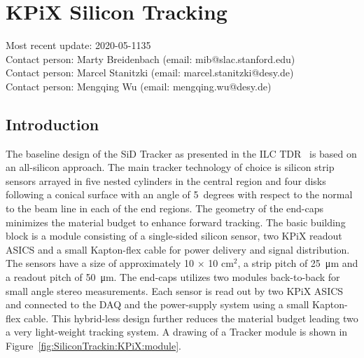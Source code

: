 \newcommand{\LYCORIS}{{\textsc{Lycoris}}\xspace}
\newcommand{\DESYII}{{\mbox{DESY II}}\xspace}
\newcommand{\DIITBF}{{\DESYII Test Beam Facility}\xspace}
\newcommand{\SID}{{SiD}\xspace}
\newcommand{\KPIX}{{KPiX}\xspace}


\section{\KPIX Silicon Tracking}
Most recent update: 2020-05-1135 \\
Contact person: Marty Breidenbach (email: mib@slac.stanford.edu)\\
Contact person: Marcel Stanitzki (email: marcel.stanitzki@desy.de)\\
Contact person: Mengqing Wu (email: mengqing.wu@desy.de)\\




\subsection{Introduction}
The baseline design of the \SID Tracker as presented in the ILC TDR~\cite{Behnke:2013lya} is based on an all-silicon approach.
The main tracker technology of choice is silicon strip sensors arrayed in five nested cylinders in the central
region and four disks following a conical surface with an angle of 5~degrees with respect to the normal to the 
beam line in each of the end regions. The geometry of the end-caps minimizes the material budget to enhance 
forward tracking. The basic building block is a module consisting of a single-sided silicon sensor, two \KPIX readout ASICS and a small Kapton-flex cable
for power delivery and signal distribution.
The sensors have a size of approximately 10 $\times$ 10 cm$^2$, a strip pitch of \SI{25}{\micro\meter} and a readout pitch of \SI{50}{\micro\meter}.
The end-caps utilizes two modules back-to-back for small angle stereo measurements. 
Each sensor is read out by two \KPIX ASICS and connected to the DAQ and the power-supply system using a small Kapton-flex cable. This hybrid-less design 
further reduces the material budget leading two a very light-weight tracking system. A drawing of a Tracker module is shown in 
Figure~\ref{fig:SiliconTrackin:KPiX:module}.


